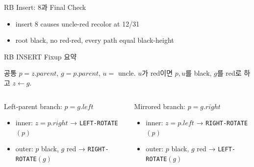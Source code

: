 \begin{frame}{RB Insert: 8과 Final Check}
\centering{}
\begin{itemize}\item insert 8 causes uncle-red recolor at 12/31\item root black, no red-red, every path equal black-height\end{itemize}
\end{frame}
\begin{frame}{RB INSERT Fixup 요약}
\small
\begin{block}{공통}
$p=z.parent$, $g=p.parent$, $u=$ uncle. $u$가 red이면 $p,u$를 black, $g$를 red로 하고 $z\gets g$.
\end{block}
\begin{columns}[T]
\begin{block}{Left-parent branch: $p=g.left$}
\begin{itemize}\item inner: $z=p.right$ → \texttt{LEFT-ROTATE}$(p)$\item outer: $p$ black, $g$ red → \texttt{RIGHT-ROTATE}$(g)$\end{itemize}
\end{block}
\begin{block}{Mirrored branch: $p=g.right$}
\begin{itemize}\item inner: $z=p.left$ → \texttt{RIGHT-ROTATE}$(p)$\item outer: $p$ black, $g$ red → \texttt{LEFT-ROTATE}$(g)$\end{itemize}
\end{block}
\end{columns}
\end{frame}
